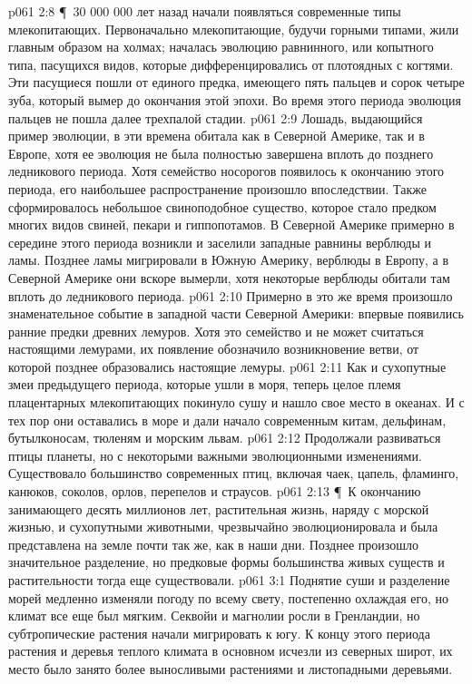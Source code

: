 \vs p061 2:8 \P\ 30 000 000 лет назад начали появляться современные типы млекопитающих. Первоначально млекопитающие, будучи горными типами, жили главным образом на холмах;  началась эволюцию равнинного, или копытного типа, пасущихся видов, которые дифференцировались от плотоядных с когтями. Эти пасущиеся пошли от единого предка, имеющего пять пальцев и сорок четыре зуба, который вымер до окончания этой эпохи. Во время этого периода эволюция пальцев не пошла далее трехпалой стадии.
\vs p061 2:9 Лошадь, выдающийся пример эволюции, в эти времена обитала как в Северной Америке, так и в Европе, хотя ее эволюция не была полностью завершена вплоть до позднего ледникового периода. Хотя семейство носорогов появилось к окончанию этого периода, его наибольшее распространение произошло впоследствии. Также сформировалось небольшое свиноподобное существо, которое стало предком многих видов свиней, пекари и гиппопотамов. В Северной Америке примерно в середине этого периода возникли и заселили западные равнины верблюды и ламы. Позднее ламы мигрировали в Южную Америку, верблюды в Европу, а в Северной Америке они вскоре вымерли, хотя некоторые верблюды обитали там вплоть до ледникового периода.
\vs p061 2:10 Примерно в это же время произошло знаменательное событие в западной части Северной Америки: впервые появились ранние предки древних лемуров. Хотя это семейство и не может считаться настоящими лемурами, их появление обозначило возникновение ветви, от которой позднее образовались настоящие лемуры.
\vs p061 2:11 Как и сухопутные змеи предыдущего периода, которые ушли в моря, теперь целое племя плацентарных млекопитающих покинуло сушу и нашло свое место в океанах. И с тех пор они оставались в море и дали начало современным китам, дельфинам, бутылконосам, тюленям и морским львам.
\vs p061 2:12 Продолжали развиваться птицы планеты, но с некоторыми важными эволюционными изменениями. Существовало большинство современных птиц, включая чаек, цапель, фламинго, канюков, соколов, орлов, перепелов и страусов.
\vs p061 2:13 \P\ К окончанию  занимающего десять миллионов лет, растительная жизнь, наряду с морской жизнью, и сухопутными животными, чрезвычайно эволюционировала и была представлена на земле почти так же, как в наши дни. Позднее произошло значительное разделение, но предковые формы большинства живых существ и растительности тогда еще существовали.
\vs p061 3:1 Поднятие суши и разделение морей медленно изменяли погоду по всему свету, постепенно охлаждая его, но климат все еще был мягким. Секвойи и магнолии росли в Гренландии, но субтропические растения начали мигрировать к югу. К концу этого периода растения и деревья теплого климата в основном исчезли из северных широт, их место было занято более выносливыми растениями и листопадными деревьями.
